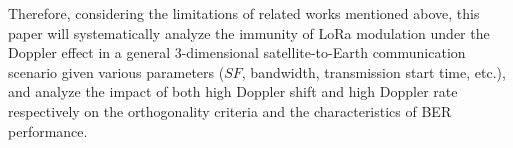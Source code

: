 Therefore, considering the limitations of related works mentioned above, this paper will systematically analyze the immunity of LoRa modulation under the Doppler effect in a general 3-dimensional satellite-to-Earth communication scenario given various parameters ($SF$, bandwidth, transmission start time, etc.), and analyze the impact of both high Doppler shift and high Doppler rate respectively on the orthogonality criteria and the characteristics of BER performance.